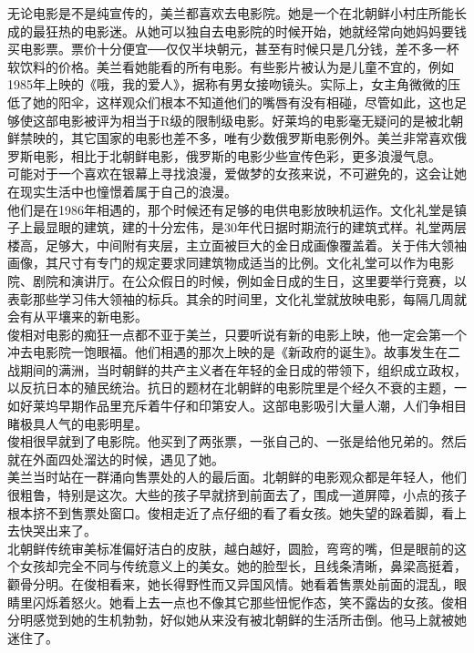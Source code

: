 无论电影是不是纯宣传的，美兰都喜欢去电影院。她是一个在北朝鲜小村庄所能长成的最狂热的电影迷。从她可以独自去电影院的时候开始，她就经常向她妈妈要钱买电影票。票价十分便宜──仅仅半块朝元，甚至有时候只是几分钱，差不多一杯软饮料的价格。美兰看她能看的所有电影。有些影片被认为是儿童不宜的，例如1985年上映的《哦，我的爱人》，据称有男女接吻镜头。实际上，女主角微微的压低了她的阳伞，这样观众们根本不知道他们的嘴唇有没有相碰，尽管如此，这也足够使这部电影被评为相当于R级的限制级电影。好莱坞的电影毫无疑问的是被北朝鲜禁映的，其它国家的电影也差不多，唯有少数俄罗斯电影例外。美兰非常喜欢俄罗斯电影，相比于北朝鲜电影，俄罗斯的电影少些宣传色彩，更多浪漫气息。\\

可能对于一个喜欢在银幕上寻找浪漫，爱做梦的女孩来说，不可避免的，这会让她在现实生活中也憧憬着属于自己的浪漫。\\

他们是在1986年相遇的，那个时候还有足够的电供电影放映机运作。文化礼堂是镇子上最显眼的建筑，建的十分宏伟，是30年代日据时期流行的建筑式样。礼堂两层楼高，足够大，中间附有夹层，主立面被巨大的金日成画像覆盖着。关于伟大领袖画像，其尺寸有专门的规定要求同建筑物成适当的比例。文化礼堂可以作为电影院、剧院和演讲厅。在公众假日的时候，例如金日成的生日，这里要举行竞赛，以表彰那些学习伟大领袖的标兵。其余的时间里，文化礼堂就放映电影，每隔几周就会有从平壤来的新电影。\\

俊相对电影的痴狂一点都不亚于美兰，只要听说有新的电影上映，他一定会第一个冲去电影院一饱眼福。他们相遇的那次上映的是《新政府的诞生》。故事发生在二战期间的满洲，当时朝鲜的共产主义者在年轻的金日成的带领下，组织成立政权，以反抗日本的殖民统治。抗日的题材在北朝鲜的电影院里是个经久不衰的主题，一如好莱坞早期作品里充斥着牛仔和印第安人。这部电影吸引大量人潮，人们争相目睹极具人气的电影明星。\\

俊相很早就到了电影院。他买到了两张票，一张自己的、一张是给他兄弟的。然后就在外面四处溜达的时候，遇见了她。\\

美兰当时站在一群涌向售票处的人的最后面。北朝鲜的电影观众都是年轻人，他们很粗鲁，特别是这次。大些的孩子早就挤到前面去了，围成一道屏障，小点的孩子根本挤不到售票处窗口。俊相走近了点仔细的看了看女孩。她失望的跺着脚，看上去快哭出来了。\\

北朝鲜传统审美标准偏好洁白的皮肤，越白越好，圆脸，弯弯的嘴，但是眼前的这个女孩却完全不同与传统意义上的美女。她的脸型长，且线条清晰，鼻梁高挺着，颧骨分明。在俊相看来，她长得野性而又异国风情。她看着售票处前面的混乱，眼睛里闪烁着怒火。她看上去一点也不像其它那些忸怩作态，笑不露齿的女孩。俊相分明感觉到她的生机勃勃，好似她从来没有被北朝鲜的生活所击倒。他马上就被她迷住了。\\

